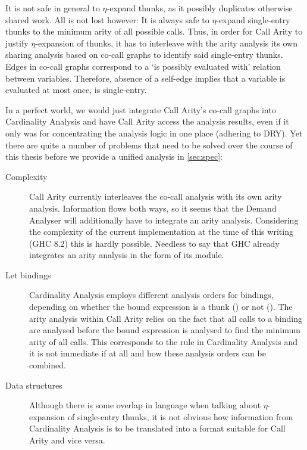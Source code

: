 It is not safe in general to $\eta$-expand thunks, as it possibly duplicates otherwise shared work. 
All is not lost however: It is always safe to $\eta$-expand single-entry thunks to the minimum arity of all possible calls.
Thus, in order for Call Arity to justify $\eta$-expansion of thunks, it has to interleave with the arity analysis its own sharing analysis based on co-call graphs \parencite{callarity} to identify said single-entry thunks.
Edges in co-call graphs correspond to a `is possibly evaluated with' relation between variables.
Therefore, absence of a self-edge implies that a variable is evaluated at most once, \eg is single-entry.

In a perfect world, we would just integrate Call Arity's co-call graphs into Cardinality Analysis and have Call Arity access the analysis results, even if it only was for concentrating the analysis logic in one place (adhering to DRY).
Yet there are quite a number of problems that need to be solved over the course of this thesis before we provide a unified analysis in \cref{sec:spec}:
\begin{description}
  \item[Complexity] 
    Call Arity currently interleaves the co-call analysis with its own arity analysis.
    Information flows both ways, so it seems that the Demand Analyser will additionally have to integrate an arity analysis.
    Considering the complexity of the current implementation at the time of this writing (GHC 8.2) this is hardly possible.
    Needless to say that GHC already integrates an arity analysis in the form of its  module.
  \item[Let bindings]
    Cardinality Analysis employs different analysis orders for  bindings, depending on whether the bound expression is a thunk () or not ().
    The arity analysis within Call Arity relies on the fact that all calls to a binding are analysed before the bound expression is analysed to find the minimum arity of all calls.
    This corresponds to the  rule in Cardinality Analysis and it is not immediate if at all and how these analysis orders can be combined.
  \item[Data structures]
    Although there is some overlap in language when talking about $\eta$-expansion of single-entry thunks, it is not obvious how information from Cardinality Analysis is to be translated into a format suitable for Call Arity and vice versa.
\end{description}

